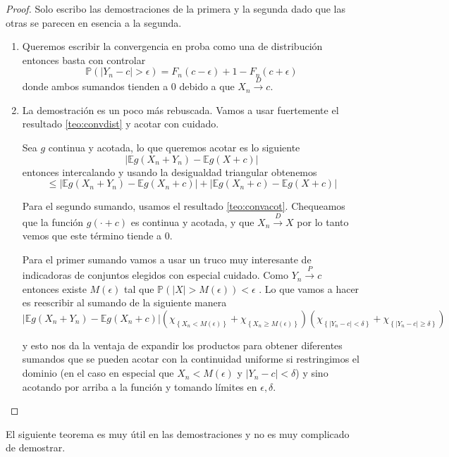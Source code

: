 \documentclass[11pt]{article}
\theoremstyle{plain} %
\theoremstyle{definition}
\theoremstyle{remark}
\def\E{\mathbb{E}}
\def\P{\mathbb{P}}
\newcommand{\proba}{\overset{P}{\to}}
\newcommand{\dist}{\overset{D}{\to}}
\begin{document}
\begin{proof}
	Solo escribo las demostraciones de la primera y la segunda dado que las otras se parecen en esencia a la segunda.
	\begin{enumerate}
		\item Queremos escribir la convergencia en proba como una de distribución entonces basta con controlar 
		\[\P(\left| Y_n -c \right| > \epsilon ) = F_n(c - \epsilon) + 1 - F_n(c + \epsilon) \]
		donde ambos sumandos tienden a 0 debido a que $X_n \dist c$.
		
		\item La demostración es un poco más rebuscada. Vamos a usar fuertemente el resultado \ref{teo:convdist} y acotar con cuidado.
		
		Sea $g$ continua y acotada, lo que queremos acotar es lo siguiente
		\[ \left| \E  g(X_n + Y_n) - \E g(X + c)  \right| \]
		entonces intercalando y usando la desigualdad triangular obtenemos 
		\[ \leq \left| \E  g(X_n + Y_n) - \E g(X_n + c)  \right| + \left| \E  g(X_n + c) - \E g(X + c)  \right| \]
		
		Para el segundo sumando, usamos el resultado \ref{teo:convacot}. Chequeamos que la función $g(\cdot + c)$ es continua y acotada, y que $X_n \dist X$ por lo tanto vemos que este término tiende a 0.
		
		Para el primer sumando vamos a usar un truco muy interesante de indicadoras de conjuntos elegidos con especial cuidado. Como $Y_n \proba c$ entonces existe $M(\epsilon)$ tal que $\P\left( \left|X \right| > M(\epsilon) \right) < \epsilon  $ . Lo que vamos a hacer es reescribir al sumando de la siguiente manera
		\[ \left| \E  g(X_n + Y_n) - \E g(X_n + c)  \right| \left( \chi_{\left\lbrace X_n < M(\epsilon) \right\rbrace } + \chi_{\left\lbrace X_n \geq M(\epsilon) \right\rbrace } \right) \left( \chi_{\left\lbrace |Y_n - c| < \delta \right\rbrace } + \chi_{\left\lbrace |Y_n - c| \geq \delta \right\rbrace } \right) \]
		
		y esto nos da la ventaja de expandir los productos para obtener diferentes sumandos que se pueden acotar con la continuidad uniforme si restringimos el dominio (en el caso en especial que $X_n < M(\epsilon)$ y $|Y_n - c| < \delta $) y sino acotando por arriba a la función y tomando límites en $\epsilon, \delta$.  
		  
	\end{enumerate}
\end{proof}

El siguiente teorema es muy útil en las demostraciones y no es muy complicado de demostrar.
\end{document}
